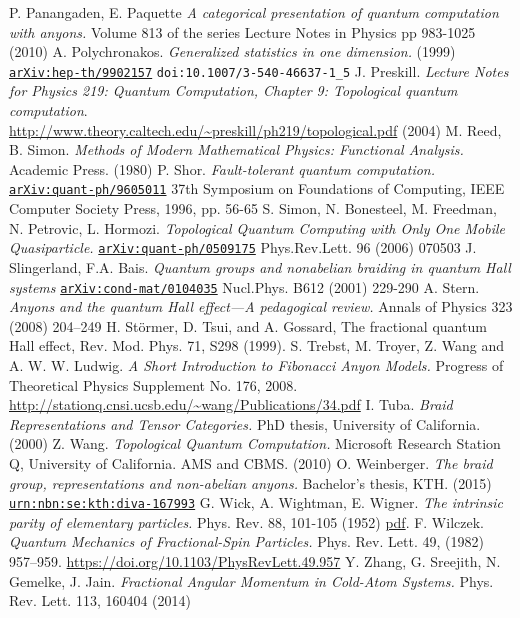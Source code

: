 \begin{thebibliography}{99}
 P. Panangaden, E. Paquette \textit{A categorical presentation of quantum computation with anyons.} Volume 813 of the series Lecture Notes in Physics pp 983-1025 (2010) %
 A. Polychronakos. \textit{Generalized statistics in one dimension.} (1999) \href{https://arxiv.org/abs/hep-th/9902157}{\texttt{arXiv:hep-th/9902157}} \verb|doi:10.1007/3-540-46637-1_5|
 J. Preskill. \textit{Lecture Notes for Physics 219: Quantum Computation, Chapter 9: Topological quantum computation}. \\ \url{http://www.theory.caltech.edu/~preskill/ph219/topological.pdf} (2004)
 M. Reed, B. Simon. \textit{Methods of Modern Mathematical Physics: Functional Analysis.} Academic Press. (1980)
 P. Shor. \textit{Fault-tolerant quantum computation.} \href{https://arxiv.org/abs/quant-ph/9605011}{\texttt{arXiv:quant-ph/9605011}} 37th Symposium on Foundations of Computing, IEEE Computer Society Press, 1996, pp. 56-65
 S. Simon, N. Bonesteel, M. Freedman, N. Petrovic, L. Hormozi. \textit{Topological Quantum Computing with Only One Mobile Quasiparticle.} \href{https://arxiv.org/abs/quant-ph/0509175}{\texttt{arXiv:quant-ph/0509175}} Phys.Rev.Lett. 96 (2006) 070503
 J. Slingerland, F.A. Bais. \textit{Quantum groups and nonabelian braiding in quantum Hall systems} \href{https://arxiv.org/abs/cond-mat/0104035}{\texttt{arXiv:cond-mat/0104035}} Nucl.Phys. B612 (2001) 229-290
 A. Stern. \textit{Anyons and the quantum Hall effect—A pedagogical review.} Annals of Physics 323 (2008) 204–249
 H. Störmer, D. Tsui, and A. Gossard, The fractional quantum Hall effect, Rev. Mod. Phys. 71, S298 (1999).
 S. Trebst, M. Troyer, Z. Wang and A. W. W. Ludwig. \textit{A Short Introduction to Fibonacci Anyon Models.} Progress of Theoretical Physics Supplement No. 176, 2008. \\ \url{http://stationq.cnsi.ucsb.edu/~wang/Publications/34.pdf}
 I. Tuba. \textit{Braid Representations and Tensor Categories.} PhD thesis, University of California. (2000)
 Z. Wang. \textit{Topological Quantum Computation.} Microsoft Research Station Q, University of California. AMS and CBMS. (2010)
 O. Weinberger. \textit{The braid group, representations and non-abelian anyons.} Bachelor's thesis, KTH. (2015) \href{urn:nbn:se:kth:diva-167993}{\texttt{urn:nbn:se:kth:diva-167993}}
 G. Wick, A. Wightman, E. Wigner. \textit{The intrinsic parity of elementary particles.} Phys. Rev. 88, 101-105 (1952) \href{http://dieumsnh.qfb.umich.mx/archivoshistoricosmq/ModernaHist/Wick.pdf}{pdf}.
 F. Wilczek. \textit{Quantum Mechanics of Fractional-Spin Particles.} Phys. Rev. Lett. 49, (1982) 957–959. \url{https://doi.org/10.1103/PhysRevLett.49.957}
 Y. Zhang, G. Sreejith, N. Gemelke, J. Jain. \textit{Fractional Angular Momentum in Cold-Atom Systems.} Phys. Rev. Lett. 113, 160404 (2014)
\end{thebibliography}


